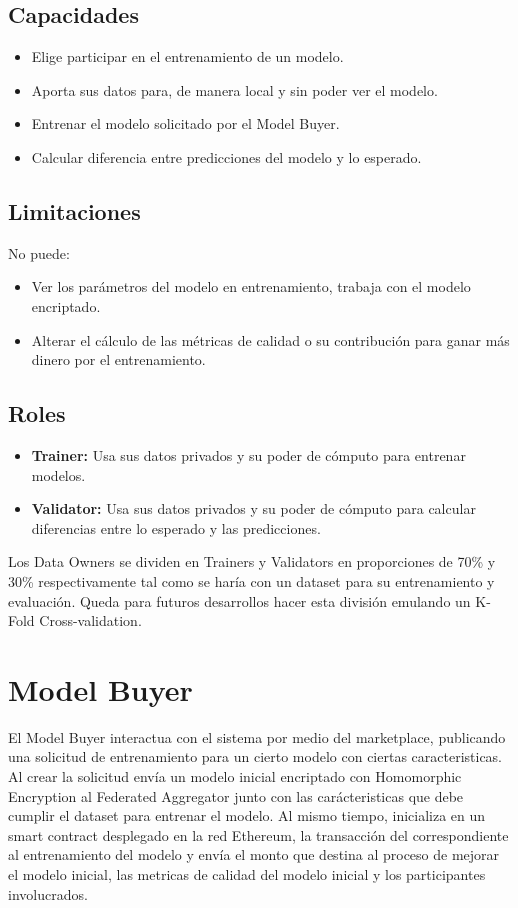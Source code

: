 \documentclass[
11pt, %
oneside, %
spanish, %
singlespacing, %
parskip, %
headsepline, %
chapterinoneline, %
]{MastersDoctoralThesis} %
\begin{document}
\subsection*{Capacidades}
\begin{itemize}
\item Elige participar en el entrenamiento de un modelo.
\item Aporta sus datos para, de manera local y sin poder ver el modelo.
\item Entrenar el modelo solicitado por el Model Buyer.
\item Calcular diferencia entre predicciones del modelo y lo esperado.
\end{itemize}

\subsection*{Limitaciones}
No puede:
\begin{itemize}
\item Ver los parámetros del modelo en entrenamiento, trabaja con el modelo encriptado.
\item Alterar el cálculo de las métricas de calidad o su contribución para ganar más dinero por el entrenamiento. 
\end{itemize}

\subsection*{Roles}
\begin{itemize}
\item \textbf{Trainer:} Usa sus datos privados y su poder de cómputo para entrenar modelos.
\item \textbf{Validator:} Usa sus datos privados y su poder de cómputo para  calcular diferencias entre lo esperado y las predicciones.
\end{itemize}

Los Data Owners se dividen en Trainers y Validators en proporciones de 70\% y 30\% respectivamente tal como se haría con un dataset para su entrenamiento y evaluación. Queda para futuros desarrollos hacer esta división emulando un K-Fold Cross-validation.


\section{Model Buyer}
\justify
El Model Buyer interactua con el sistema por medio del marketplace, publicando una solicitud de entrenamiento para un cierto modelo con ciertas caracteristicas.
Al crear la solicitud envía un modelo inicial encriptado con Homomorphic Encryption al Federated Aggregator junto con  las carácteristicas que debe cumplir el dataset para entrenar el modelo. 
Al mismo tiempo, inicializa en un smart contract desplegado en la red Ethereum, la transacción del correspondiente al entrenamiento del modelo y envía el monto que destina al proceso de mejorar el modelo inicial, las metricas de calidad del modelo inicial y los participantes involucrados.
\end{document}
